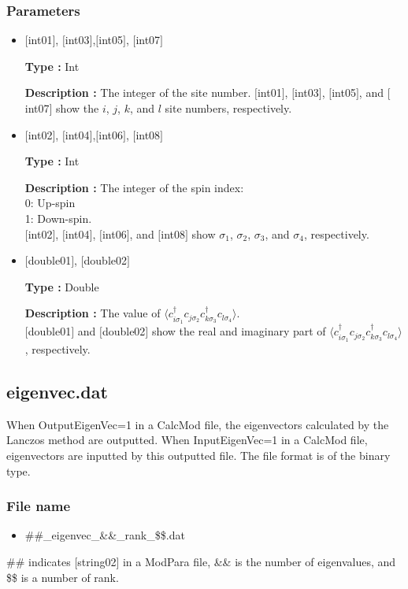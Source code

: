 \subsubsection{Parameters}
 \begin{itemize}

 \item  $[$int01$]$, $[$int03$]$,$[$int05$]$, $[$int07$]$

 {\bf Type :} Int

{\bf Description :} 
The integer of the site number. $[$int01$]$, $[$int03$]$, $[$int05$]$, and $[$int07$]$  show the $i$, $j$, $k$, and $l$ site numbers, respectively.
 
  \item  $[$int02$]$, $[$int04$]$,$[$int06$]$, $[$int08$]$

 {\bf Type :} Int 

{\bf Description :} The integer of the spin index:\\
   0: Up-spin\\
   1: Down-spin.\\ 
$[$int02$]$, $[$int04$]$, $[$int06$]$, and $[$int08$]$ show $\sigma_1$, $\sigma_2$, $\sigma_3$, and $\sigma_4$,  respectively. 

 \item  $[$double01$]$, $[$double02$]$

 {\bf Type :} Double 

{\bf Description :} The value of $\langle c_{i\sigma_1}^{\dagger}c_{j\sigma_2}c_{k\sigma_3}^{\dagger}c_{l\sigma_4}\rangle$.\\
$[$double01$]$ and $[$double02$]$ show the real and imaginary part of $\langle c_{i\sigma_1}^{\dagger}c_{j\sigma_2}c_{k\sigma_3}^{\dagger}c_{l\sigma_4}\rangle$, respectively.

\end{itemize}

\newpage
\subsection{eigenvec.dat}
\label{Subsec:eigenvec}
When OutputEigenVec=1 in a CalcMod file, the eigenvectors calculated by the Lanczos method are outputted. When InputEigenVec=1 in a CalcMod file, eigenvectors are inputted by this outputted file. The file format is of the binary type. 

\subsubsection{File name}
\begin{itemize}
   \item{\#\#\_eigenvec\_{\&\&}\_rank\_{\$\$}.dat}
\end{itemize}
  \#\# indicates [string02] in a ModPara file, \&\& is the number of eigenvalues, and \$\$ is a number of rank.

